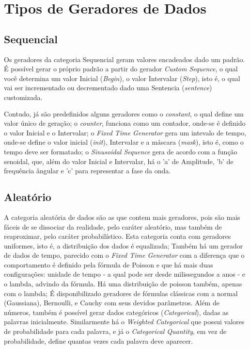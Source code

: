\documentclass[
	12pt,				%
	openright,			%
	twoside,			%
	a4paper,			%
	english,			%
	brazil				%
	]{abntex2}
\begin{document}
	\section{Tipos de Geradores de Dados}
		\subsection{Sequencial}
		Os geradores da categoria Sequencial geram valores encadeados dado um padrão.
		É possível gerar o próprio padrão a partir do gerador \emph{Custom Sequence}, o qual você determina um valor Inicial (\emph{Begin}), o valor Intervalar (\emph{Step}), isto é, o qual vai ser incrementado ou decrementado dado uma Sentencia (\emph{sentence}) customizada.
		\par
		Contudo, já são predefinidos alguns geradores como 
			o \emph{constant}, o qual define um valor único de geração;
			o \emph{counter}, funciona como um contador, onde-se é definido o valor Inicial e o Intervalar;
			o \emph{Fixed Time Generator} gera um intevalo de tempo, onde-se define o valor inicial (\emph{init}), Intervalar e a máscara (\emph{mask}), isto é, como o tempo deve ser formatado;
			o \emph{Sinusoidal Sequence} gera de acordo com a função senoidal, que, além do valor Inicial e Intervalar, há o 'a' de Amplitude, 'b' de frequência ângular e 'c' para representar a fase da onda.

		\subsection{Aleatório}
		A categoria aleatória de dados são as que contem mais geradores, pois são mais fáceis de se dissociar da realidade, pelo caráter aleatório, mas também de reaproximar, pelo caráter probabilístico.
		Esta categoria conta com geradores uniformes, isto é, a distribuição dos dados é equalizada;
			Também há um gerador de dados de tempo, parecido com o \emph{Fixed Time Generator} com a diferença que o comportamento é definido pela fórmula de Poisson e que há mais duas configurações: unidade de tempo - a qual pode ser desde milissegundos a anos - e o lambda, advindo da fórmula.
			Há uma distribuição de poisson também, apenas com o lambda;
			É disponibilizado geradores de fórmulas clássicas com a normal (Gaussiana), Bernoulli, e Cauchy com seus devidos parâmetros.
			Além de números, também é possível gerar dados categóricos (\emph{Categorical}), dadas as palavras inicialmente.
			Similarmente há o \emph{Weighted Categorical} que possui valores de probabilidade para cada palavra, e 
			já o \emph{Categorical Quantity}, em vez de probabilidade, define quantas vezes cada palavra deve aparecer.
\end{document}
